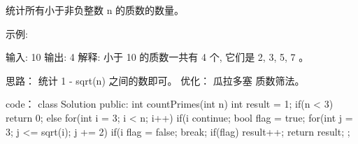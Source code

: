 统计所有小于非负整数 n 的质数的数量。

示例:

输入: 10
输出: 4
解释: 小于 10 的质数一共有 4 个, 它们是 2, 3, 5, 7 。










思路：
统计 1 - sqrt(n) 之间的数即可。
优化：
瓜拉多塞 质数筛法。














code：
class Solution {
public:
    int countPrimes(int n) {
        int result = 1;
        if(n < 3) return 0;
        else
        {
            for(int i = 3; i < n; i++)
            {
                if(i %
                {
                    continue;
                }
                bool flag = true;
                for(int j = 3; j <= sqrt(i); j += 2)
                {
                    if(i %
                    {
                        flag = false;
                        break;
                    }
                }
                if(flag)
                    result++;
            }
            return result;
        }
    }
};